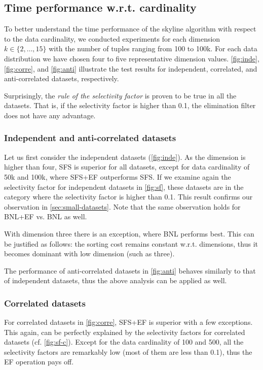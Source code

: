 \subsection{Time performance w.r.t. cardinality}

To better understand the time performance of the skyline algorithm
with respect to the data cardinality, we conducted experiments for
each dimension $k \in \{2, \ldots, 15\}$ with the number of tuples
ranging from 100 to 100k.  For each data distribution we have chosen
four to five representative dimension values.  \autoref{fig:inde},
\ref{fig:corre}, and \ref{fig:anti} illustrate the test results for
independent, correlated, and anti-correlated datasets, respectively.

Surprisingly, the \emph{rule of the selectivity factor} is proven to
be true in all the datasets.  That is, if the selectivity factor is
higher than 0.1, the elimination filter does not have any advantage.

\subsubsection{Independent and anti-correlated datasets}
Let us first consider the independent datasets
(\autoref{fig:inde}).  As the dimension is higher than four, SFS is
superior for all datasets, except for data cardinality of 50k and
100k, where SFS+EF outperforms SFS.  If we examine again the
selectivity factor for independent datasets in \autoref{fig:sf},
these datasets are in the category where the selectivity factor is
higher than 0.1. This result confirms our observation in
\autoref{sec:small-datasets}.  Note that the same observation
holds for BNL+EF vs. BNL as well.

With dimension three there is an exception, where BNL performs best.
This can be justified as follows: the sorting cost remains constant
w.r.t. dimensions, thus it becomes dominant with low dimension (such
as three).

The performance of anti-correlated datasets in \autoref{fig:anti}
behaves similarly to that of independent datasets, thus the above
analysis can be applied as well.

\subsubsection{Correlated datasets}
For correlated datasets in \autoref{fig:corre}, SFS+EF is superior
with a few exceptions. This again, can be perfectly explained by the
selectivity factors for correlated datasets
(cf. \autoref{fig:sf-c}).  Except for the data cardinality of 100
and 500, all the selectivity factors are remarkably low (most of them
are less than 0.1), thus the EF operation pays off.

